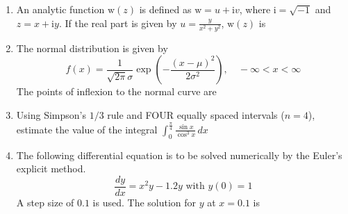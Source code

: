 \documentclass[journal,12pt,onecolumn]{IEEEtran}
\theoremstyle{remark}
\begin{document}
\begin{enumerate}
\item An analytic function $\mathrm{w}(z)$ is defined as $\mathrm{w}=u+\mathrm{i}v$, where $\mathrm{i} = \sqrt{-1}$ and $z = x + \mathrm{i}y$. If the real part is given by $u=\frac{y}{x^2 + y^2}$, $\mathrm{w}(z)$ is
\hfill{}
\begin{enumerate}
\end{enumerate}

\item The normal distribution is given by
\[f(x) = \frac{1}{\sqrt{2\pi} \sigma} \exp \left( -\frac{(x-\mu)^2}{2\sigma^2} \right), \quad -\infty<x<\infty\]
The points of inflexion to the normal curve are
\hfill{}
\begin{enumerate}
\end{enumerate}

\item Using Simpson's $1/3$ rule and FOUR equally spaced intervals ($n = 4$), estimate the value of the integral $\int_{0}^{\frac{\pi}{4}} \frac{\sin x}{\cos^3 x} \, dx$
\hfill{}
\begin{enumerate}
\end{enumerate}

\item The following differential equation is to be solved numerically by the Euler's explicit method.
\[\frac{dy}{dx} = x^2 y - 1.2 y \text{ with } y(0)=1\]
A step size of $0.1$ is used. The solution for $y$ at $x=0.1$ is
\hfill{}
\begin{enumerate}
\end{enumerate}


\end{enumerate}
\end{document}
